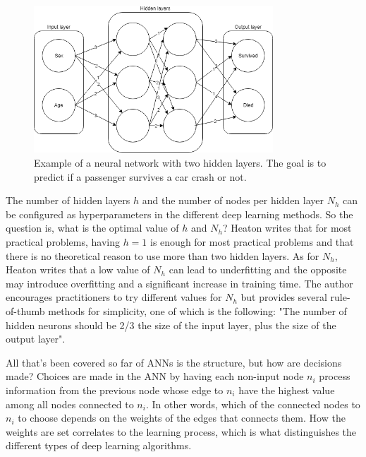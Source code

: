 \begin{figure}[H] 
	\centering
	\includegraphics[width=0.8\textwidth]{media/neuralnetwork_ex.png}
	\caption{Example of a neural network with two hidden layers. The goal is to predict if a passenger survives a car crash or not.}
	\label{fig:neuralnetwork_example}
\end{figure}

			The number of hidden layers $h$ and the number of nodes per hidden layer $N_h$ can be configured as hyperparameters in the different deep learning methods. So the question is, what is the optimal value of $h$ and $N_h$? Heaton \cite{BOOK:10} writes that for most practical problems, having $h=1$ is enough for most practical problems and that there is no theoretical reason to use more than two hidden layers. As for $N_h$, Heaton writes that a low value of $N_h$ can lead to underfitting and the opposite may introduce overfitting and a significant increase in training time. The author encourages practitioners to try different values for $N_h$ but provides several rule-of-thumb methods for simplicity, one of which is the following: "The number of hidden neurons should be 2/3 the size of the input layer, plus the size of the output layer". %

			All that's been covered so far of ANNs is the structure, but how are decisions made? Choices are made in the ANN by having each non-input node $n_i$ process information from the previous node whose edge to $n_i$ have the highest value among all nodes connected to $n_i$. In other words, which of the connected nodes to $n_i$ to choose depends on the weights of the edges that connects them. How the weights are set correlates to the learning process, which is what distinguishes the different types of deep learning algorithms.

